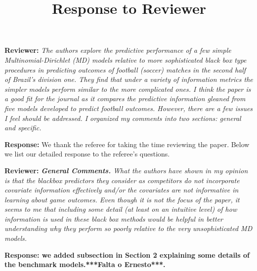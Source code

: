 \documentclass[11pt]{article}
\title{Response to Reviewer}
\date{}
\renewcommand{\vec}[1]{\mathbf{#1}}
\begin{document}
\maketitle

\hspace{4mm} \textbf{Reviewer:} \textit{
	The authors explore the predictive performance of a few simple Multinomial-Dirichlet (MD)
	models relative to more sophisticated black box type procedures in predicting outcomes of
	football (soccer) matches in the second half of Brazil's division one. They find that under a
	variety of information metrics the simpler models perform similar to the more complicated ones.
	I think the paper is a good fit for the journal as it compares the predictive information gleaned
	from five models developed to predict football outcomes. However, there are a few issues I feel
	should be addressed. I organized my comments into two sections: general and specific.}

\vspace{2mm}
\textbf{Response:} We thank the referee for taking the time reviewing the paper. Below we list our detailed response to the referee's questions.\\

\vspace{6mm}

\hspace{4mm} \textbf{Reviewer:} \textit{\textbf{General Comments.}
	What the authors have shown in my opinion is that the blackbox predictors they consider as
	competitors do not incorporate covariate information effectively and/or the covariates are not
	informative in learning about game outcomes. Even though it is not the focus of the paper,
	it seems to me that including some detail (at least on an intuitive level) of how information is
	used in these black box methods would be helpful in better understanding why they perform so
	poorly relative to the very unsophisticated MD models.}

\vspace{2mm}
\textbf{Response: we added subsection in Section 2 explaining some details of the benchmark models.***Falta o Ernesto***.} 


\end{document}
